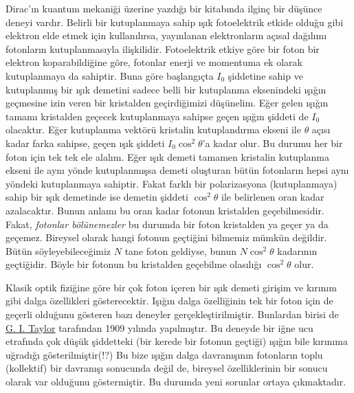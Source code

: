 \documentclass[a4paper,12pt, twoside]{article}
\begin{document}
Dirac'ın kuantum mekaniği üzerine yazdığı bir kitabında ilginç bir düşünce deneyi vardır. Belirli bir kutuplanmaya sahip ışık fotoelektrik etkide olduğu gibi elektron elde etmek için kullanılırsa, yayınlanan elektronların açısal dağılımı fotonların kutuplanmasıyla ilişkilidir. Fotoelektrik etkiye göre bir foton bir elektron koparabildiğine göre, fotonlar enerji ve momentuma ek olarak kutuplanmaya da sahiptir. Buna göre başlangıçta $I_0$ şiddetine sahip ve kutuplanmış bir ışık demetini sadece belli bir kutuplanma eksenindeki ışığın geçmesine izin veren bir kristalden geçirdiğimizi düşünelim. Eğer gelen ışığın tamamı kristalden geçecek kutuplanmaya sahipse geçen ışığın şiddeti de $I_0$ olacaktır. Eğer kutuplanma vektörü kristalin kutuplandırma ekseni ile $\theta$ açısı kadar farka sahipse, geçen ışık şiddeti $I_0 \cos^2 \theta$'a kadar olur. Bu durumu her bir foton için tek tek ele alalım. Eğer ışık demeti tamamen kristalin kutuplanma ekseni ile aynı yönde kutuplanmışsa demeti oluşturan bütün fotonların hepsi aynı yöndeki kutuplanmaya sahiptir. Fakat farklı bir polarizasyona (kutuplanmaya) sahip bir ışık demetinde ise demetin şiddeti  $\cos^2 \theta$ ile belirlenen oran kadar azalacaktır. Bunun anlamı bu oran kadar fotonun kristalden geçebilmesidir. Fakat, \emph{fotonlar bölünemezler} bu durumda bir foton kristalden ya geçer ya da geçemez. Bireysel olarak hangi fotonun geçtiğini bilmemiz mümkün değildir. Bütün söyleyebileceğimiz $N$ tane foton geldiyse, bunun $N \cos^2 \theta$ kadarının geçtiğidir. Böyle bir fotonun bu kristalden geçebilme olasılığı $\cos^2\theta$ olur.

Klasik optik fiziğine göre  bir çok foton içeren bir ışık demeti girişim ve kırınım gibi dalga özellikleri gösterecektir. Işığın dalga özelliğinin tek bir foton için de geçerli olduğunu gösteren bazı deneyler gerçekleştirilmiştir. Bunlardan birisi de \href{https://en.wikipedia.org/wiki/G._I._Taylor#Career_and_research}{G. I. Taylor} tarafından 1909 yılında yapılmıştır. Bu deneyde bir iğne ucu etrafında çok düşük şiddetteki (bir kerede bir fotonun geçtiği) ışığın bile kırınıma uğradığı gösterilmiştir(!?) Bu bize ışığın dalga davranışının fotonların toplu (kollektif) bir davranışı sonucunda değil de, bireysel özelliklerinin bir sonucu olarak var olduğunu göstermiştir. Bu durumda yeni sorunlar ortaya çıkmaktadır.


\end{document}

